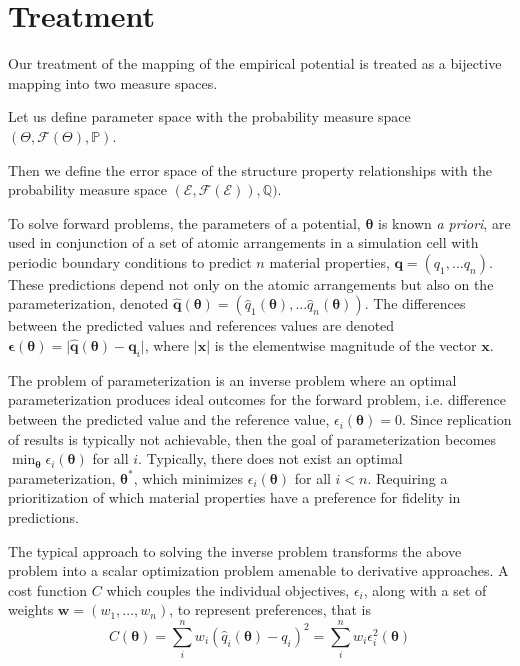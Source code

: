 \section{Treatment}

Our treatment of the mapping of the empirical potential is treated as a bijective mapping into two measure spaces.

Let us define parameter space with the probability measure space $(\Theta,\mathcal{F}(\Theta),\mathbb{P})$.

Then we define the error space of the structure property relationships with the probability measure space $(\mathcal{E},\mathcal{F}(\mathcal{E})),\mathbb{Q})$.


To solve forward problems, the parameters of a potential, $\bm{\theta}$ is known \emph{a priori}, are used in conjunction of a set of atomic arrangements in a simulation cell with periodic boundary conditions to predict $n$ material properties, $\bm{q} = (q_1,...q_n)$.  These predictions depend not only on the atomic arrangements but also on the parameterization, denoted
$\bm{\hat{q}}(\bm{\theta}) =
    (\hat{q}_1(\bm{\theta}),...\hat{q}_n(\bm{\theta}))$.
The differences between the predicted values and references values are denoted
$\bm{\epsilon}(\bm{\theta}) =
    \lvert \bm{\hat{q}}(\bm{\theta})
         - \bm{q}_i
    \rvert$,
where $|\bm{x}|$ is the elementwise magnitude of the vector $\bm{x}$.

The problem of parameterization is an inverse problem where an optimal parameterization produces ideal outcomes for the forward problem, i.e. difference between the predicted value and the reference value,
$\epsilon_i(\bm{\theta}) = 0$.
Since replication of results is typically not achievable, then the goal of parameterization becomes
$\min_{\bm{\theta}} \epsilon_i(\bm{\theta})$
for all $i$.  Typically, there does not exist an optimal parameterization, $\bm{\theta}^*$, which minimizes $\epsilon_i(\bm{\theta})$ for all $i < n$.  Requiring a prioritization of which material properties have a preference for fidelity in predictions.

The typical approach to solving the inverse problem transforms the above problem into a scalar optimization problem amenable to derivative approaches.  A cost function $C$ which couples the individual objectives, $\epsilon_i$, along with a set of weights $\bm{w} = (w_1,...,w_n)$, to represent preferences, that is
\begin{equation}
    C(\bm{\theta}) = \sum_i^n w_i (\hat{q}_i(\bm{\theta}) - q_i)^2
                   = \sum_i^n w_i \epsilon_i^2(\bm{\theta})
\end{equation}

